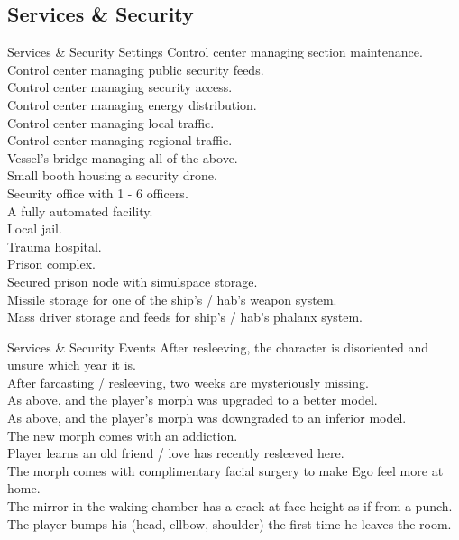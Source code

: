 \starttableone
\stoptableone



\subsection*{Services \& Security}

\begin{tableone}{Services \& Security Settings}
Control center managing section maintenance.\\
Control center managing public security feeds.\\
Control center managing security access.\\
Control center managing energy distribution.\\
Control center managing local traffic.\\
Control center managing regional traffic.\\
Vessel's bridge managing all of the above.\\
Small booth housing a security drone.\\
Security office with 1 - 6 officers.\\
A fully automated  facility.\\

Local jail.\\
Trauma hospital.\\
Prison complex.\\
Secured prison node with simulspace storage.\\
Missile storage for one of the ship's / hab's weapon system.\\
Mass driver storage and feeds for ship's / hab's phalanx system.\\
\end{tableone}



\begin{tableone}{Services \& Security Events}
After resleeving, the character is disoriented and unsure which year it is.\\
After farcasting / resleeving, two weeks are mysteriously missing.\\
As above, and the player's morph was upgraded to a better model.\\
As above, and the player's morph was downgraded to an inferior model.\\
The new morph comes with an addiction.\\
Player learns an old friend / love has recently resleeved here.\\
The morph comes with complimentary facial surgery to make Ego feel more at home.\\
The mirror in the waking chamber has a crack at face height as if from a punch.\\
The player bumps his (head, ellbow, shoulder) the first time he leaves the room.\\
\end{tableone}



